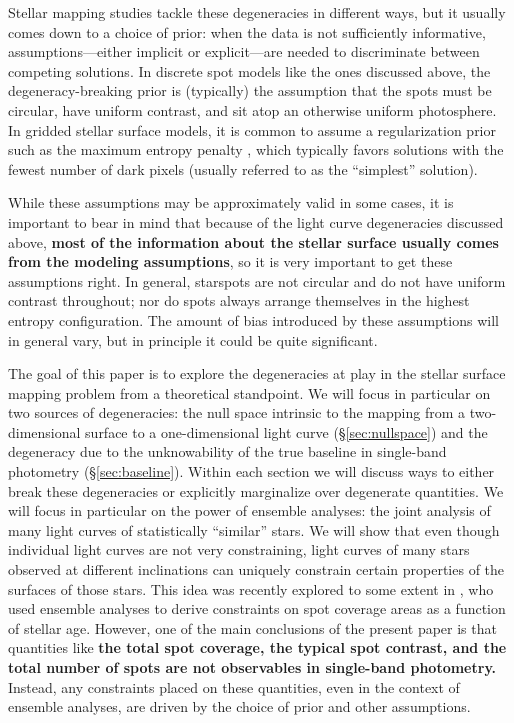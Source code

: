 \documentclass[modern]{aastex62}
\newcommand{\dfm}[1]{{\color{blue}#1}}
\begin{document}
Stellar mapping studies tackle these degeneracies in different ways, but
it usually comes down to a choice of prior: when the data is not
sufficiently informative, assumptions\dfm{---either implicit or explicit---}are needed to discriminate
between competing solutions. In discrete spot models like the ones
discussed above, the degeneracy-breaking prior is (typically) the assumption that the
spots must be circular, have uniform contrast, and sit atop an otherwise
uniform photosphere. In gridded stellar surface models, it is common to
assume a regularization prior such as the maximum entropy penalty
\citep[e.g.,][]{Vogt1987}, which typically favors solutions with the fewest
number of dark pixels (usually referred to as the ``simplest'' solution).

While these assumptions may be approximately valid in some cases, it is
important to bear in mind that because of the light curve degeneracies discussed above,
\textbf{most of the information about the stellar surface usually comes from the \dfm{modeling assumptions}},
so it is very important to \dfm{get these assumptions right}. In general, starspots are not circular and do not have uniform
contrast throughout; nor do spots always arrange themselves in the highest
entropy configuration. The amount of bias introduced by these assumptions
will in general vary, but in principle it could be quite significant.


The goal of this paper is to explore the degeneracies at play in the
stellar surface mapping problem from a theoretical standpoint.
We will focus in particular on two sources of degeneracies: the
null space intrinsic to the mapping from a two-dimensional surface to
a one-dimensional light curve (\S\ref{sec:nullspace})
and the degeneracy due to the unknowability of the true baseline in
single-band photometry (\S\ref{sec:baseline}). Within each section we
will discuss ways to either break these degeneracies or explicitly marginalize
over degenerate quantities.
We will focus in particular on the power of ensemble analyses: the
joint analysis of many light curves of statistically ``similar''
stars. We will show that even though individual light curves are not very
constraining, light curves of many stars
observed at different inclinations can uniquely constrain certain
properties of the surfaces of those stars.
%
This idea was recently explored to some extent
in \citet{Morris2020}, who used ensemble analyses to derive constraints on
spot coverage areas as a function of stellar age. However, one of
the main conclusions of the present paper is that
quantities like \textbf{the
    total spot coverage, the typical spot contrast, and the total number of
    spots are not observables in single-band photometry.} Instead,
any constraints placed on these quantities, even in the context of
ensemble analyses, are \dfm{driven by the choice of prior and other assumptions}. %
\end{document}
